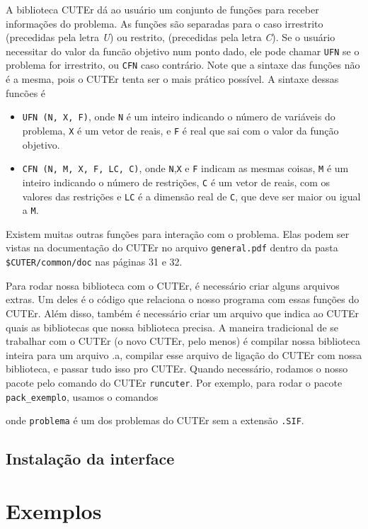 \documentclass[letterpaper,11pt]{article}
\numberwithin{equation}{section}
\begin{document}
A biblioteca CUTEr dá ao usuário um conjunto de funções para receber informações do problema.
As funções são separadas para o caso irrestrito (precedidas pela letra \emph{U}) ou
restrito, (precedidas pela letra \emph{C}). Se o usuário necessitar do valor da funcão
 objetivo num ponto dado, ele pode chamar \verb+UFN+ se o problema for irrestrito, ou
\verb+CFN+ caso contrário. Note que a sintaxe das funções não é a mesma, pois o CUTEr tenta
ser o mais prático possível. A sintaxe dessas funcões é
\begin{itemize}
 \item \verb+UFN (N, X, F)+, onde \verb+N+ é um inteiro indicando o número de 
variáveis do problema, \verb+X+ é um vetor de
reais, e \verb+F+ é real que sai com o valor da função objetivo.
 \item \verb+CFN (N, M, X, F, LC, C)+, onde \verb+N+,\verb+X+ e \verb+F+ indicam as
mesmas coisas, \verb+M+ é um inteiro indicando o número de restrições, \verb+C+ é um
vetor de reais, com os valores das restrições e \verb+LC+ é a dimensão real de \verb+C+,
que deve ser maior ou igual a \verb+M+.
\end{itemize}
Existem muitas outras funções para interação com o problema. Elas podem ser vistas na
documentação do CUTEr no arquivo \verb+general.pdf+ dentro da pasta
\verb+$CUTER/common/doc+ nas páginas 31 e 32.

Para rodar nossa biblioteca com o CUTEr, é necessário criar alguns arquivos extras.
Um deles é o código que relaciona o nosso programa com essas funções do CUTEr. Além disso,
também é necessário criar um arquivo que indica ao CUTEr quais as bibliotecas que nossa
biblioteca precisa. A maneira tradicional de se trabalhar com o CUTEr (o novo CUTEr, pelo
menos) é compilar nossa biblioteca inteira para um arquivo .a, compilar esse arquivo de
ligação do CUTEr com nossa biblioteca, e passar tudo isso pro CUTEr. Quando necessário,
rodamos o nosso pacote pelo comando do CUTEr \verb+runcuter+. Por exemplo, para rodar o
pacote \verb+pack_exemplo+, usamos o comandos
onde \verb+problema+ é um dos problemas do CUTEr sem a extensão \verb+.SIF+.

\subsection{Instalação da interface}

\section{Exemplos}
\end{document}
